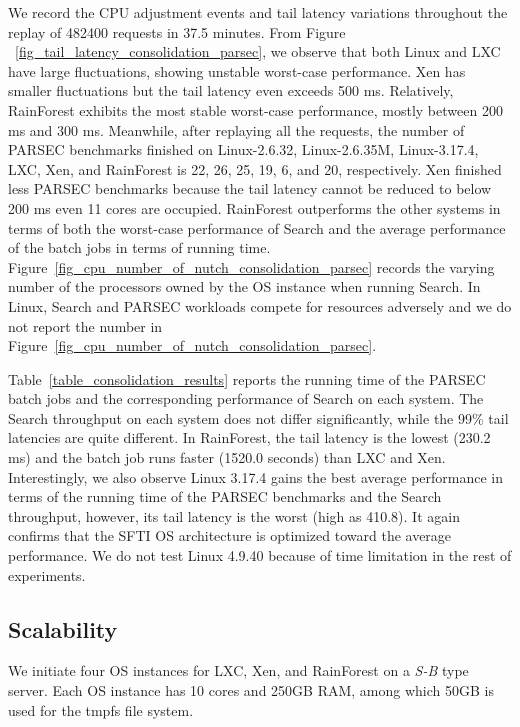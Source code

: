 \documentclass[pageno]{jpaper}
\begin{document}
We record the CPU adjustment events and tail latency variations throughout the replay of 482400 requests in 37.5 minutes. From Figure ~\ref{fig_tail_latency_consolidation_parsec}, we observe that both Linux and LXC have large fluctuations, showing unstable worst-case performance. Xen has smaller fluctuations but the tail latency even exceeds 500 ms. Relatively, RainForest exhibits the most stable worst-case performance, mostly between 200 ms and 300 ms. Meanwhile, after replaying all the requests, the number of PARSEC benchmarks finished on Linux-2.6.32, Linux-2.6.35M, Linux-3.17.4, LXC, Xen, and RainForest is  22, 26, 25, 19, 6, and 20,  respectively. Xen finished less PARSEC benchmarks because the tail latency cannot be reduced to below 200 ms even 11 cores are occupied. RainForest outperforms the other systems in terms of both the worst-case performance of Search and the average  performance of the batch jobs in terms of running time.
Figure~\ref{fig_cpu_number_of_nutch_consolidation_parsec}  records the varying number of the processors owned by the OS
instance when running Search. In Linux, Search and PARSEC workloads compete for resources adversely and we do not report the number in Figure~\ref{fig_cpu_number_of_nutch_consolidation_parsec}.



Table~\ref{table_consolidation_results} reports the running time of the PARSEC batch jobs and the corresponding performance of Search on each system. The Search throughput on each system  does not differ significantly, while the 99\% tail latencies are quite different. In RainForest, the tail latency is the lowest (230.2 ms) and the batch job runs faster (1520.0 seconds) than LXC and Xen. Interestingly, we also observe Linux 3.17.4 gains the best average performance in terms of the running time of the PARSEC benchmarks and the Search throughput, however, its tail latency is the worst (high as 410.8). It again confirms that the SFTI OS architecture is optimized toward the average performance. We do not test Linux 4.9.40 because of time limitation in the rest of experiments.





















\subsection{Scalability}
We initiate  four OS instances for LXC, Xen, and RainForest on a \emph{S-B} type server. Each OS instance has 10 cores and 250GB RAM, among which 50GB is used for the tmpfs file system.
\end{document}
